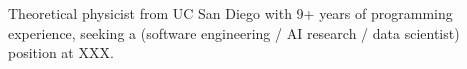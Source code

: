 \documentclass[letter,12pt]{article}
\begin{document}

Theoretical physicist from UC San Diego with 9+ years of programming experience, seeking a (software engineering / AI research / data scientist) position at XXX. 
\end{document}
